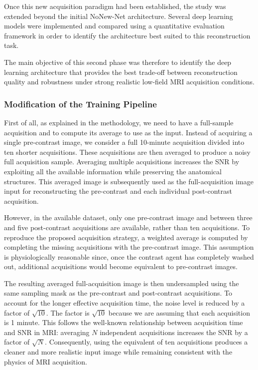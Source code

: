 \documentclass[12pt]{article}
\begin{document}
Once this new acquisition paradigm had been established, the study was extended beyond the initial NoNew-Net architecture. 
Several deep learning models were implemented and compared using a quantitative evaluation framework in order to identify the architecture best suited to this reconstruction task.
\vspace{0.5cm}

The main objective of this second phase was therefore to identify the deep learning architecture that provides the best trade-off between reconstruction quality and robustness under strong realistic low-field MRI acquisition conditions.

\subsubsection{Modification of the Training Pipeline} 

First of all, as explained in the methodology, we need to have a full-sample acquisition and to compute its average to use as the input.
Instead of acquiring a single pre-contrast image, we consider a full 10-minute acquisition divided into ten shorter acquisitions. 
These acquisitions are then averaged to produce a noisy full acquisition sample. 
Averaging multiple acquisitions increases the SNR by exploiting all the available information while preserving the anatomical structures. 
This averaged image is subsequently used as the full-acquisition image input for reconstructing the pre-contrast and each individual post-contrast acquisition.
\vspace{0.5cm}

However, in the available dataset, only one pre-contrast image and between three and five post-contrast acquisitions are available, rather than ten acquisitions.
To reproduce the proposed acquisition strategy, a weighted average is computed by completing the missing acquisitions with the pre-contrast image. 
This assumption is physiologically reasonable since, once the contrast agent has completely washed out, additional acquisitions would become equivalent to pre-contrast images.
\vspace{0.5cm}

The resulting averaged full-acquisition image is then undersampled using the same sampling mask as the pre-contrast and post-contrast acquisitions.
To account for the longer effective acquisition time, the noise level is reduced by a factor of $\sqrt{10}$. 
The factor is $\sqrt{10}$ because we are assuming that each acquisition is 1 minute.
This follows the well-known relationship between acquisition time and SNR in MRI: averaging $N$ independent acquisitions increases the SNR by a factor of $\sqrt{N}$. 
Consequently, using the equivalent of ten acquisitions produces a cleaner and more realistic input image while remaining consistent with the physics of MRI acquisition.
\end{document}
